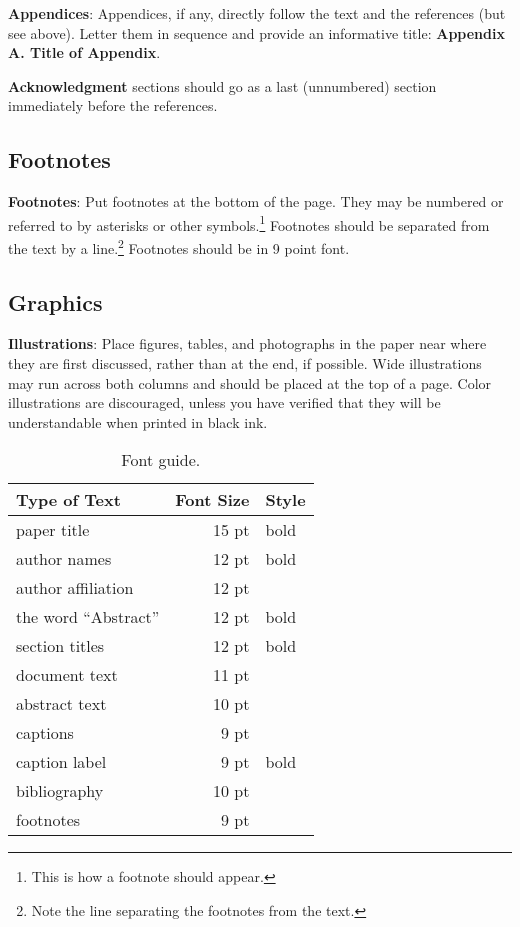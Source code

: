 \documentclass[11pt,letterpaper]{article}
\begin{document}
{\bf Appendices}: Appendices, if any, directly follow the text and the
references (but see above).  Letter them in sequence and provide an
informative title: {\bf Appendix A. Title of Appendix}.

\textbf{Acknowledgment} sections should go as a last (unnumbered) section immediately
before the references.  


\subsection{Footnotes}

{\bf Footnotes}: Put footnotes at the bottom of the page. They may
be numbered or referred to by asterisks or other
symbols.\footnote{This is how a footnote should appear.} Footnotes
should be separated from the text by a line.\footnote{Note the
line separating the footnotes from the text.}  Footnotes should be in 9 point font.

\subsection{Graphics}

{\bf Illustrations}: Place figures, tables, and photographs in the
paper near where they are first discussed, rather than at the end, if
possible.  Wide illustrations may run across both columns and should be placed at
the top of a page. Color illustrations are discouraged, unless you have verified that 
they will be understandable when printed in black ink. 

\begin{table}
\small
\centering
\begin{tabular}{|l|rl|}
\hline \bf Type of Text & \bf Font Size & \bf Style \\ \hline
paper title & 15 pt & bold \\
author names & 12 pt & bold \\
author affiliation & 12 pt & \\
the word ``Abstract'' & 12 pt & bold \\
section titles & 12 pt & bold \\
document text & 11 pt  &\\
abstract text & 10 pt & \\
captions & 9 pt & \\
caption label & 9 pt & bold \\
bibliography & 10 pt & \\
footnotes & 9 pt & \\
\hline
\end{tabular}
\caption{\label{font-table} Font guide.}
\end{table}
\end{document}
